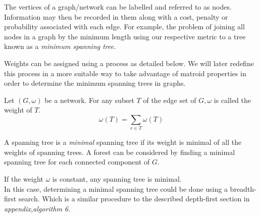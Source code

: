 \documentclass[../main.tex]{subfiles}
\begin{document}
\noindent The vertices of a graph/network can be labelled and referred to as nodes. Information may then be recorded in them along with a cost, penalty or probability associated with each edge. For example, the problem of joining all nodes in a graph by the minimum length using our respective metric to a tree known as a \textit{minimum spanning tree}.

\noindent Weights can be assigned using a process as detailed below. We will later redefine this process in a more suitable way to take advantage of matroid properties in order to determine the minimum spanning trees in graphs.
\begin{defn}
Let $(G,\omega)$ be a network. For any subset $T$ of the edge set of $G, \omega$ is called the weight of $T.$\\
\begin{equation}
\omega (T) = \displaystyle\sum_{e \in T} \omega (T)
\end{equation}
\end{defn}

\begin{defn}
A spanning tree is a \textit{minimal} spanning tree if its weight is minimal of all the weights of spanning trees.
\noindent A forest can be considered by finding a minimal spanning tree for each connected component of $G.$
\end{defn}

\begin{rem}
If the weight $\omega$ is constant, any spanning tree is minimal.\\
\noindent In this case, determining a minimal spanning tree could be done using a breadth-first search. Which is a similar procedure to the described depth-first section in \textit{appendix,algorithm 6}.
\end{rem}

 
\end{document}
